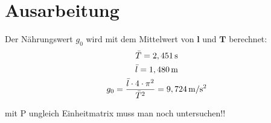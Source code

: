 \chapter{Ausarbeitung}
Der Nährungswert $g_0$ wird mit dem Mittelwert von $\bm{l}$ und $\bm{T}$ berechnet:
\begin{gather*}
	\bar{T} = 2,451 \,\mathrm{s} \\
	\bar{l} = 1,480 \,\mathrm{m} \\
	g_0 = \frac{\bar{l} \cdot 4 \cdot \pi^2}{\bar{T}^2} = 9,724 \,\mathrm{m/s^2}
\end{gather*}

mit P ungleich Einheitmatrix muss man noch untersuchen!!